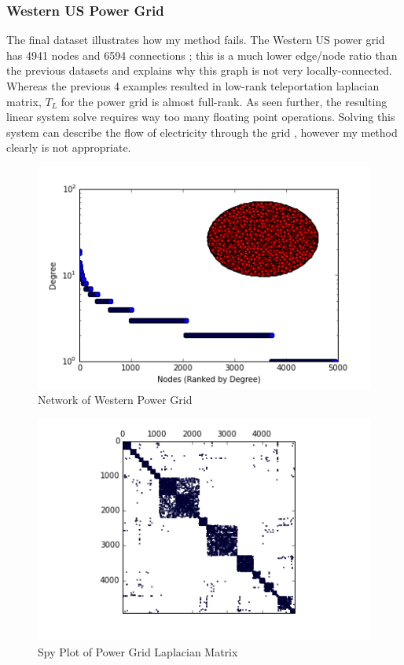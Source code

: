 \documentclass{article}
\begin{document}
\subsubsection{Western US Power Grid}
The final dataset illustrates how my method fails. The Western US power grid has 4941 nodes and 6594 connections \cite{Watts:1998}; this is a much lower edge/node ratio than the previous datasets and explains why this graph is not very locally-connected. Whereas the previous 4 examples resulted in low-rank teleportation laplacian matrix, $T_L$ for the power grid is almost full-rank. As seen further, the resulting linear system solve requires way too many floating point operations. Solving this system can describe the flow of electricity through the grid \cite{Pagani:2013}, however my method clearly is not appropriate. 

\begin{figure}
\centering

\includegraphics[width=\linewidth]{power_degree_histogram.png}
\caption{Network of Western Power Grid}
  
\end{figure}

\begin{figure}
\centering
\includegraphics[width = \linewidth]{powerspy.png}
\caption{Spy Plot of Power Grid Laplacian Matrix}
\end{figure}
\end{document}
